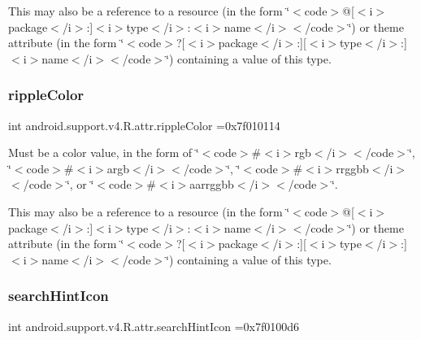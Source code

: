 This may also be a reference to a resource (in the form \char`\"{}$<$code$>$@\mbox{[}$<$i$>$package$<$/i$>$\+:\mbox{]}$<$i$>$type$<$/i$>$\+:$<$i$>$name$<$/i$>$$<$/code$>$\char`\"{}) or theme attribute (in the form \char`\"{}$<$code$>$?\mbox{[}$<$i$>$package$<$/i$>$\+:\mbox{]}\mbox{[}$<$i$>$type$<$/i$>$\+:\mbox{]}$<$i$>$name$<$/i$>$$<$/code$>$\char`\"{}) containing a value of this type. \mbox{\label{classandroid_1_1support_1_1v4_1_1R_1_1attr_a883228f1bbc2373c6a179b2e8e914e61}} 
\subsubsection{\texorpdfstring{ripple\+Color}{rippleColor}}
{\footnotesize\ttfamily int android.\+support.\+v4.\+R.\+attr.\+ripple\+Color =0x7f010114\hspace{0.3cm}{\ttfamily [static]}}

Must be a color value, in the form of \char`\"{}$<$code$>$\#$<$i$>$rgb$<$/i$>$$<$/code$>$\char`\"{}, \char`\"{}$<$code$>$\#$<$i$>$argb$<$/i$>$$<$/code$>$\char`\"{}, \char`\"{}$<$code$>$\#$<$i$>$rrggbb$<$/i$>$$<$/code$>$\char`\"{}, or \char`\"{}$<$code$>$\#$<$i$>$aarrggbb$<$/i$>$$<$/code$>$\char`\"{}. 

This may also be a reference to a resource (in the form \char`\"{}$<$code$>$@\mbox{[}$<$i$>$package$<$/i$>$\+:\mbox{]}$<$i$>$type$<$/i$>$\+:$<$i$>$name$<$/i$>$$<$/code$>$\char`\"{}) or theme attribute (in the form \char`\"{}$<$code$>$?\mbox{[}$<$i$>$package$<$/i$>$\+:\mbox{]}\mbox{[}$<$i$>$type$<$/i$>$\+:\mbox{]}$<$i$>$name$<$/i$>$$<$/code$>$\char`\"{}) containing a value of this type. \mbox{\label{classandroid_1_1support_1_1v4_1_1R_1_1attr_a4ee7e6e81237caeac9648d5b6ce2f5df}} 
\subsubsection{\texorpdfstring{search\+Hint\+Icon}{searchHintIcon}}
{\footnotesize\ttfamily int android.\+support.\+v4.\+R.\+attr.\+search\+Hint\+Icon =0x7f0100d6\hspace{0.3cm}{\ttfamily [static]}}

